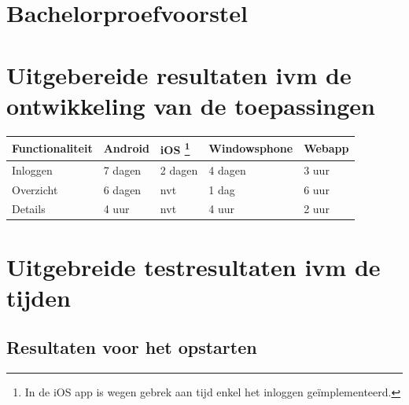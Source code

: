 \documentclass[pdftex,a4paper,12pt,twoside]{report}
\begin{document}
\tableofcontents

\appendix

\chapter{Bachelorproefvoorstel}



\chapter{Uitgebereide resultaten ivm de ontwikkeling van de toepassingen}
\label{ch:uitgebereideresultatenmetbetrekkingtotontwikkeling}
\begin{center}
  \begin{tabular}{ | l | l | l | l | l |}
    \hline
    Functionaliteit & Android & iOS \footnote{In de iOS app is wegen gebrek aan tijd enkel het inloggen geïmplementeerd.} & Windowsphone & Webapp
    \\ \hline
    Inloggen & 7 dagen & 2 dagen & 4 dagen & 3 uur
    \\ \hline
    Overzicht & 6 dagen & nvt & 1 dag & 6 uur
    \\ \hline
    Details & 4 uur & nvt & 4 uur & 2 uur
    \\ \hline
  \end{tabular}
\end{center}


\chapter{Uitgebreide testresultaten ivm de tijden}
\label{ch:uitgebereidresultatenmetbetrekkingtottijden}

\section{Resultaten voor het opstarten}
\end{document}
